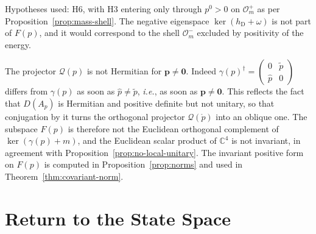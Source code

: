 \noindent Hypotheses used: H6, with H3 entering only through $p^0>0$ on $\mathcal{O}_m^+$ as per Proposition~\ref{prop:mass-shell}. The negative eigenspace $\ker(h_{\mathrm{D}}+\omega)$ is not part of $F(p)$, and it would correspond to the shell $\mathcal{O}_m^-$ excluded by positivity of the energy.

\begin{remark}\label{rem:Q-not-hermitian}
	The projector $\mathcal{Q}(p)$ is not Hermitian for $\mathbf{p}\neq\mathbf{0}$. Indeed $\gamma(p)^\dagger=\begin{pmatrix}0&\tilde{p}\\\hat{p}&0\end{pmatrix}$ differs from $\gamma(p)$ as soon as $\hat{p}\neq\tilde{p}$, \textit{i.e.}, as soon as $\mathbf{p}\neq\mathbf{0}$. This reflects the fact that $D(A_p)$ is Hermitian and positive definite but not unitary, so that conjugation by it turns the orthogonal projector $\mathcal{Q}(\mathring{p})$ into an oblique one. The subspace $F(p)$ is therefore not the Euclidean orthogonal complement of $\ker(\gamma(p)+m)$, and the Euclidean scalar product of $\mathbb{C}^4$ is not invariant, in agreement with Proposition~\ref{prop:no-local-unitary}. The invariant positive form on $F(p)$ is computed in Proposition~\ref{prop:norms} and used in Theorem~\ref{thm:covariant-norm}.
\end{remark}

\section{Return to the State Space}
\label{sec:probability}

